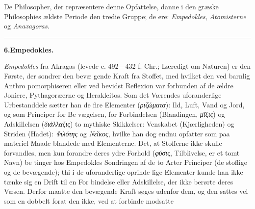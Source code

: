 \documentclass[12pt,a4paper]{book}
\newcommand{\divrule}{\begin{center}\rule{2cm}{0.4pt}\end{center}}
\newcommand{\gk}[1]{\textit{#1}}
\begin{document}
De Philosopher, der repræsentere denne Opfattelse, danne
i den græske Philosophies ældste Periode den tredie Gruppe;
de ere: \emph{Empedokles}, \emph{Atomisterne} og \emph{Anaxagoras}.

\divrule

\begin{center}
\textbf{6.\enspace Empedokles.}
\end{center}
\emph{Empedokles} fra Akragas (levede c. 492---432 f. Chr.;
Læredigt om Naturen) er den Første, der sondrer den bevæ\-%
gende Kraft fra Stoffet, med hvilket den ved barnlig Anthro\-%
pomorphiseren eller ved bevidst Reflexion var forbunden af de
ældre Joniere, Pythagoræerne og Herakleitos. Som det Værendes
uforanderlige Urbestanddele sætter han de fire Elementer
(\gk{ριζώματα}): Ild, Luft, Vand og Jord, og som Principer for Be\-%
vægelsen, for Forbindelsen (Blandingen, \gk{μῖξις}) og Adskillelsen
(\gk{διάλλαξις}) to mythiske Skikkelser: Venskabet (Kjærligheden)
og Striden (Hadet): \gk{Φιλότης} og \gk{Νεῖκος}, hvilke han dog endnu
opfatter som paa materiel Maade blandede med Elementerne.
Det, at Stofferne ikke skulle forvandles, men kun forandre
deres ydre Forhold (\gk{φύσις}, Tilblivelse, er et tomt Navn) be\-%
tinger hos Empedokles Sondringen af de to Arter Principer
(de stoflige og de bevægende); thi i de uforanderlige oprinde\-%
lige Elementer kunde han ikke tænke sig en Drift til en For\-%
bindelse eller Adskillelse, der ikke berørte deres Væsen. Derfor
maatte den bevægende Kraft søges udenfor dem, og den sattes
vel som en dobbelt forat den ikke, ved at forbinde modsatte
%
%
\end{document}
